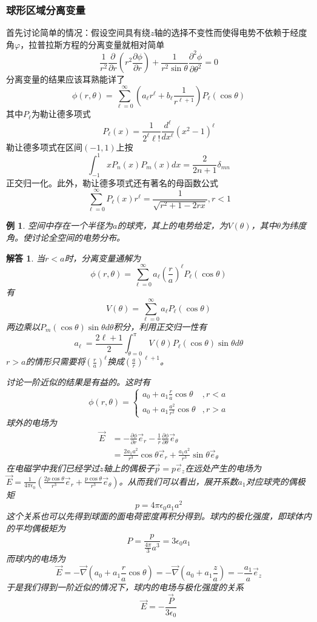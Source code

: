 \documentclass[a4paper,11pt]{ctexbook}
\newtheorem{eg}{例}[section]
\newtheorem{ans}{解答}[section]
\newcommand{\beq}{\begin{equation}}
\newcommand{\eeq}{\end{equation}}
\newcommand{\bea}{\begin{equation}\begin{aligned}}
\newcommand{\eea}{\end{aligned}\end{equation}}
\newcommand{\del}{\vec{\nabla}}
\newcommand{\epv}{\epsilon_0}
\newcommand{\pfrac}[2]{\frac{\partial #1}{\partial #2}}
\begin{document}
\subsubsection{球形区域分离变量}
首先讨论简单的情况：假设空间具有绕$z$轴的选择不变性而使得电势不依赖于经度角$\varphi$，拉普拉斯方程的分离变量就相对简单
\beq
\frac{1}{r^2} \pfrac{}{r} (r^2 \pfrac{\phi}{r}) + \frac{1}{r^2\sin \theta} \frac{\partial^2 \phi}{\partial \theta^2} = 0
\eeq
分离变量的结果应该耳熟能详了
\beq
\phi(r,\theta) = \sum_{\ell = 0}^\infty \left(a_\ell r^\ell + b_\ell \frac{1}{r^{\ell + 1}}\right) P_\ell (\cos \theta)
\eeq
其中$P_\ell$为勒让德多项式
\beq
P_\ell (x) = \frac{1}{2^\ell \ell!} \frac{d^\ell}{dx^\ell}(x^2 - 1)^\ell
\eeq
勒让德多项式在区间$(-1,1)$上按
\beq
\int_{-1}^1 x P_n(x) P_m(x) dx = \frac{2}{2n + 1} \delta_{mn}
\eeq
正交归一化。此外，勒让德多项式还有著名的母函数公式
\beq
\sum_{\ell=0}^\infty  P_\ell(x) r^\ell  = \frac{1}{\sqrt{r^2 +1 -2rx}}, r<1
\eeq
\begin{eg}
空间中存在一个半径为$a$的球壳，其上的电势给定，为$V(\theta)$，其中$\theta$为纬度角。使讨论全空间的电势分布。
\end{eg}
\begin{ans}
当$r<a$时，分离变量通解为
\beq
\phi(r,\theta) = \sum_{\ell = 0}^\infty a_\ell \left(\frac{r}{a}\right)^\ell P_\ell (\cos \theta)
\eeq
有
\beq
V(\theta) = \sum_{\ell=0}^\infty a_\ell P_\ell (\cos \theta)
\eeq
两边乘以$P_m(\cos \theta) \sin \theta d \theta$积分，利用正交归一性有
\beq
a_\ell \ =\frac{2\ell + 1}{2} \int_{\theta = 0}^\pi V(\theta) P_\ell(\cos \theta) \sin \theta d\theta
\eeq
$r>a$的情形只需要将$(\frac{r}{a})^\ell$换成$(\frac{a}{r})^{\ell+1}$。
\par
讨论一阶近似的结果是有益的。这时有
\beq
\phi(r,\theta) = 
\begin{cases}
a_0 + a_1 \frac{r}{a} \cos \theta &, r<a \\
a_0 + a_1 \frac{a^2}{r^2} \cos \theta &, r>a
\end{cases}
\eeq
球外的电场为
\bea
\vec{E} &= -\pfrac{\phi}{r} \vec{e}_r - \frac{1}{r} \pfrac{\phi}{\theta} \vec{e}_\theta \\
&= \frac{2a_1 a^2}{r^3} \cos \theta \vec{e}_r + \frac{a_1 a^2}{r^3} \sin \theta \vec{e}_\theta
\eea
在电磁学中我们已经学过$z$轴上的偶极子$\vec{p} = p\vec{e}_z$在远处产生的电场为$\vec{E} = \frac{1}{4\pi \epv} \left( \frac{2p\cos \theta}{r^3} \vec{e}_r + \frac{p\cos \theta}{r^3} \vec{e}_\theta \right) $。从而我们可以看出，展开系数$a_1$对应球壳的偶极矩
\beq
p = 4\pi \epv a_1 a^2
\eeq
这个关系也可以先得到球面的面电荷密度再积分得到。球内的极化强度，即球体内的平均偶极矩为
\beq
P = \frac{p}{\frac{4\pi}{3}a^3} = 3\epv a_1
\eeq
而球内的电场为
\beq
\vec{E} = -\del \left(a_0 + a_1 \frac{r}{a} \cos \theta \right) = -\del \left(a_0 + a_1 \frac{z}{a} \right) = -\frac{a_1}{a} \vec{e}_z
\eeq
于是我们得到一阶近似的情况下，球内的电场与极化强度的关系
\beq
\vec{E} = - \frac{\vec P}{3\epv}
\eeq
\par
\end{ans}
\end{document}
